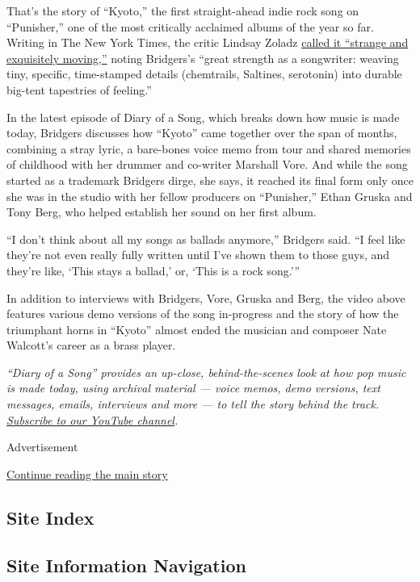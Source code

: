 That's the story of ``Kyoto,'' the first straight-ahead indie rock song
on ``Punisher,'' one of the most critically acclaimed albums of the year
so far. Writing in The New York Times, the critic Lindsay Zoladz
\href{https://www.nytimes3xbfgragh.onion/2020/06/19/arts/music/phoebe-bridgers-punisher-review.html}{called
it ``strange and exquisitely moving,''} noting Bridgers's ``great
strength as a songwriter: weaving tiny, specific, time-stamped details
(chemtrails, Saltines, serotonin) into durable big-tent tapestries of
feeling.''

In the latest episode of Diary of a Song, which breaks down how music is
made today, Bridgers discusses how ``Kyoto'' came together over the span
of months, combining a stray lyric, a bare-bones voice memo from tour
and shared memories of childhood with her drummer and co-writer Marshall
Vore. And while the song started as a trademark Bridgers dirge, she
says, it reached its final form only once she was in the studio with her
fellow producers on ``Punisher,'' Ethan Gruska and Tony Berg, who helped
establish her sound on her first album.

``I don't think about all my songs as ballads anymore,'' Bridgers said.
``I feel like they're not even really fully written until I've shown
them to those guys, and they're like, `This stays a ballad,' or, `This
is a rock song.'''

In addition to interviews with Bridgers, Vore, Gruska and Berg, the
video above features various demo versions of the song in-progress and
the story of how the triumphant horns in ``Kyoto'' almost ended the
musician and composer Nate Walcott's career as a brass player.

\emph{``Diary of a Song'' provides an up-close, behind-the-scenes look
at how pop music is made today, using archival material --- voice memos,
demo versions, text messages, emails, interviews and more --- to tell
the story behind the track.}
\href{https://www.youtube.com/playlist?list=PL4CGYNsoW2iBe_JY8XeXiUQdr2GRFgY-Z}{\emph{Subscribe
to our YouTube channel}}\emph{.}

Advertisement

\protect\hyperlink{after-bottom}{Continue reading the main story}

\hypertarget{site-index}{%
\subsection{Site Index}\label{site-index}}

\hypertarget{site-information-navigation}{%
\subsection{Site Information
Navigation}\label{site-information-navigation}}

